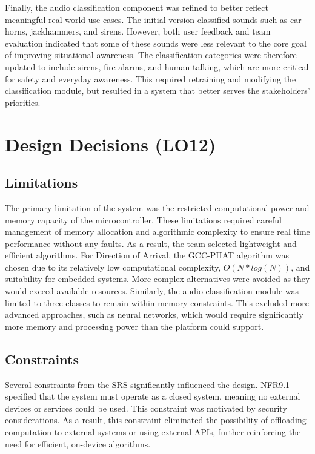 \documentclass{article}
\begin{document}
Finally, the audio classification component was refined to better reflect
meaningful real world use cases. The initial version classified sounds such as
car horns, jackhammers, and sirens. However, both user feedback and team
evaluation indicated that some of these sounds were less relevant to the core
goal of improving situational awareness. The classification categories were
therefore updated to include sirens, fire alarms, and human talking, which are
more critical for safety and everyday awareness. This required retraining and
modifying the classification module, but resulted in a system that better
serves the stakeholders' priorities.


\section{Design Decisions (LO12)}

\subsection{Limitations}

The primary limitation of the system was the restricted computational power and
memory capacity of the microcontroller. These limitations required careful
management of memory allocation and algorithmic complexity to ensure real time
performance without any faults. As a result, the team selected lightweight and
efficient algorithms. For Direction of Arrival, the GCC-PHAT algorithm was
chosen due to its relatively low computational complexity, $O(N*log(N))$, and
suitability for embedded systems. More complex alternatives were avoided as they
would exceed available resources. Similarly, the audio classification module
was limited to three classes to remain within memory constraints. This excluded
more advanced approaches, such as neural networks, which would require
significantly more memory and processing power than the platform could support.

\subsection{Constraints}

Several constraints from the SRS \cite{SRS} significantly influenced the design.
\hyperref[SRS-NFR9_1]{NFR9.1} specified that the system must operate as
a closed system, meaning no external devices or services could be used.
This constraint was motivated by security considerations. As a result, this
constraint eliminated the possibility of offloading computation to external
systems or using external APIs, further reinforcing the need for efficient,
on-device algorithms.
\end{document}
